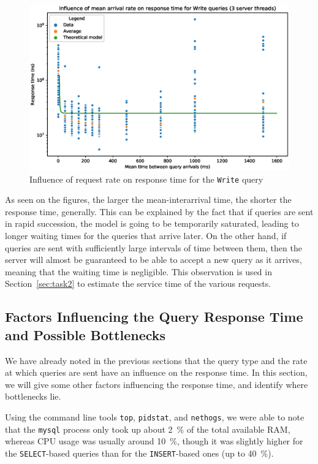 \documentclass[journal]{IEEEtran}
\theoremstyle{definition}
\newcommand{\java}[1]{\texttt{#1}}
\newcommand{\sql}[1]{\texttt{#1}}
\begin{document}
\begin{figure}[!hbtp]
	\centering
	\includegraphics[width=\columnwidth]{../plotting/rate_influence_write}
	\caption{Influence of request rate on response time for the \java{Write} query}
	\label{fig:rate_influence_write}
\end{figure}

As seen on the figures, the larger the mean-interarrival time, the shorter the response time, generally.
This can be explained by the fact that if queries are sent in rapid succession, the model is going to be temporarily saturated, leading to longer waiting times for the queries that arrive later.
On the other hand, if queries are sent with sufficiently large intervals of time between them, then the server will almost be guaranteed to be able to accept a new query as it arrives, meaning that the waiting time is negligible.
This observation is used in Section~\ref{sec:task2} to estimate the service time of the various requests.

\subsection{Factors Influencing the Query Response Time and Possible Bottlenecks}
We have already noted in the previous sections that the query type and the rate at which queries are sent have an influence on the response time.
In this section, we will give some other factors influencing the response time, and identify where bottlenecks lie.

Using the command line tools \texttt{top}, \texttt{pidstat}, and \texttt{nethogs}, we were able to note that the \texttt{mysql} process only took up about \SI{2}{\percent} of the total available RAM, whereas CPU usage was usually around \SI{10}{\percent}, though it was slightly higher for the \sql{SELECT}-based queries than for the \sql{INSERT}-based ones (up to \SI{40}{\percent}).
\end{document}
